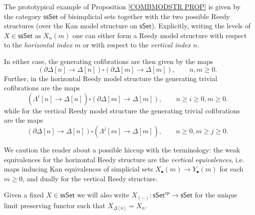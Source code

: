 \documentclass[a4paper,10pt
,draft
]{article}%
\begin{document}
The prototypical example of Proposition \ref{COMBMODSTR PROP}
is given by the category $\mathsf{ssSet}$ of bisimplicial sets together with the two possible Reedy structures (over the Kan model structure on $\mathsf{sSet}$).
Explicitly, writing the levels of 
$X \in \mathsf{ssSet}$ as $X_n(m)$
one can either form a Reedy model structure with respect to the 
\textit{horizontal index $m$}
or with respect to the 
\textit{vertical index $n$}.

In either case, the generating cofibrations are then given by the maps
\[
	\left( \partial \Delta[n] \to \Delta[n] \right)
\square
	\left( \partial \Delta[m] \to \Delta[m] \right),
	\qquad n,m\geq 0.
\]
Further, in the horizontal Reedy model structure the generating trivial cofibrations are the maps
\begin{equation}\label{GTRCOHOR EQ}
	\left( \Lambda^i[n] \to \Delta[n] \right)
\square
	\left( \partial \Delta[m] \to \Delta[m] \right),
\qquad n \geq i \geq 0,m\geq 0.
\end{equation}
while for the vertical Reedy model structure the generating trivial cofibrations are the maps
\begin{equation}\label{GTRCOVER EQ}
	\left( \partial \Delta[n] \to \Delta[n] \right)
\square
	\left( \Lambda^j[m] \to \Delta[m] \right),
\qquad n\geq 0,m\geq j \geq 0.
\end{equation}

We caution the reader about a possible hiccup with the terminology: 
the weak equivalences for the horizontal Reedy structure are the 
\textit{vertical equivalences},
i.e. maps inducing Kan equivalences of simplicial sets
$X_{\bullet}(m) \to Y_{\bullet}(m)$
for each $m \geq 0$, and dually for the vertical Reedy structure.

\begin{notation}\label{UNIQUELIM NOT}
	Given a fixed $X \in \mathsf{ssSet}$ we will also write
	$X_{(-)} \colon \mathsf{sSet}^{op} \to \mathsf{sSet}$
	for the unique limit preserving functor such that
	$X_{\Delta[n]} = X_n$.
\end{notation}

\end{document}
